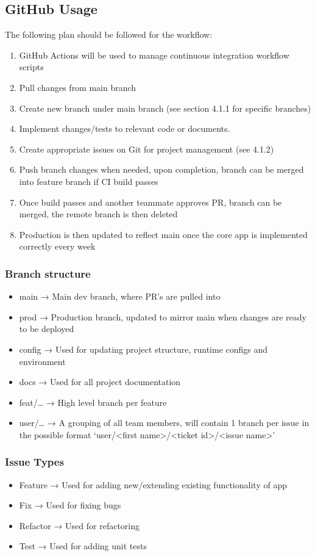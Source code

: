 \documentclass{article}
\begin{document}
	\subsection{GitHub Usage}
	The following plan should be followed for the workflow:
	\begin{enumerate}
		\item GitHub Actions will be used to manage continuous integration workflow scripts
		\item Pull changes from main branch
		\item Create new branch under main branch (see section 4.1.1 for specific branches)
		\item Implement changes/tests to relevant code or documents.
		\item Create appropriate issues on Git for project management (see 4.1.2)
		\item Push branch changes when needed, upon completion, branch can be merged into feature branch if CI build passes
		\item Once build passes and another teammate approves PR, branch can be merged, the remote branch is then deleted
		\item Production is then updated to reflect main once the core app is implemented correctly every week
	\end{enumerate}

	\subsubsection{Branch structure}
	\begin{itemize}
		\item main → Main dev branch, where PR’s are pulled into
		\item prod → Production branch, updated to mirror main when changes are ready to be deployed
		\item config → Used for updating project structure, runtime configs and environment
		\item docs → Used for all project documentation
		\item feat/… → High level branch per feature
		\item user/… → A grouping of all team members, will contain 1 branch per issue in the possible format ‘user/\textless first name\textgreater/\textless ticket id\textgreater/\textless issue name\textgreater’
	\end{itemize}

	\subsubsection{Issue Types}
	\begin{itemize}
		\item Feature → Used for adding new/extending existing functionality of app
		\item Fix → Used for fixing bugs
		\item Refactor → Used for refactoring
		\item Test → Used for adding unit tests
	\end{itemize}
\end{document}
